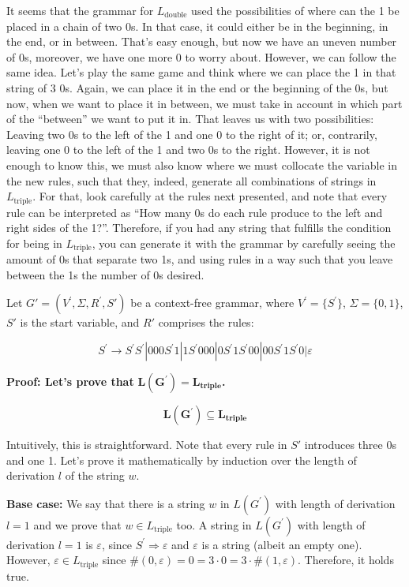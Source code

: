 \documentclass[12pt]{article}
\begin{document}
It seems that the grammar for \(L_{\text{double}}\) used the
possibilities of where can the 1 be placed in a chain of two 0s. In that
case, it could either be in the beginning, in the end, or in between.
That's easy enough, but now we have an uneven number of 0s, moreover, we
have one more 0 to worry about. However, we can follow the same idea.
Let's play the same game and think where we can place the 1 in that
string of 3 0s. Again, we can place it in the end or the beginning of
the 0s, but now, when we want to place it in between, we must take in
account in which part of the ``between'' we want to put it in. That
leaves us with two possibilities: Leaving two 0s to the left of the 1
and one 0 to the right of it; or, contrarily, leaving one 0 to the left
of the 1 and two 0s to the right. However, it is not enough to know
this, we must also know where we must collocate the variable in the new
rules, such that they, indeed, generate all combinations of strings in
\(L_{\text{triple}}.\) For that, look carefully at the rules next
presented, and note that every rule can be interpreted as ``How many 0s
do each rule produce to the left and right sides of the 1?''. Therefore,
if you had any string that fulfills the condition for being in
\(L_{\text{triple}}\), you can generate it with the grammar by carefully
seeing the amount of 0s that separate two 1s, and using rules in a way
such that you leave between the 1s the number of 0s desired.

Let \(G' = (V^{'},\Sigma,R^{'},S')\) be a context-free grammar, where
\(V^{'} = \{ S^{'}\}\), \(\Sigma = \{ 0,1\}\), \(S'\) is the start
variable, and \(R'\) comprises the rules:

\[S^{'} \rightarrow S^{'}S^{'}\left| 000S^{'}1 \right|1S^{'}000\left| 0S^{'}1S^{'}00 \right|00S^{'}1S^{'}0|\varepsilon\]

\textbf{Proof: Let's prove that}
\(\mathbf{L}\left( \mathbf{G}^{\mathbf{'}} \right)\mathbf{=}\mathbf{L}_{\mathbf{\text{triple}}}\)\textbf{.}

\[\mathbf{L}\left( \mathbf{G}^{\mathbf{'}} \right)\mathbf{\subseteq}\mathbf{L}_{\mathbf{\text{triple}}}\]

Intuitively, this is straightforward. Note that every rule in \(S'\)
introduces three 0s and one 1. Let's prove it mathematically by
induction over the length of derivation \(l\) of the string \(w\).

\textbf{Base case:} We say that there is a string \(w\) in \(L(G^{'})\) with
length of derivation \(l = 1\) and we prove that
\(w \in L_{\text{triple}}\) too. A string in \(L(G^{'})\) with length of
derivation \(l = 1\) is \(\varepsilon\), since
\(S^{'} \Rightarrow \varepsilon\) and \(\varepsilon\) is a string
(albeit an empty one). However, \(\varepsilon \in L_{\text{triple}}\)
since \(\#(0,\varepsilon) = 0 = 3 \cdot 0 = 3 \cdot \#(1,\varepsilon)\).
Therefore, it holds true.
\end{document}
